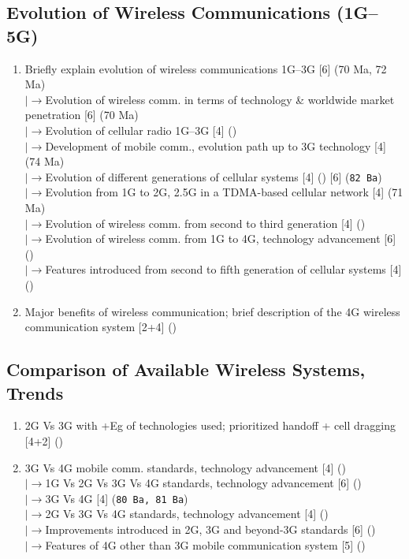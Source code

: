 \documentclass[12pt]{article}
\newcommand{\lb}{\\$\left|\rightarrow\right.$}
\begin{document}
  \subsection{Evolution of Wireless Communications (1G--5G)}
    \begin{enumerate}[topsep=0pt, noitemsep]
      \item Briefly explain evolution of wireless communications 1G--3G \hfill [6] (70 Ma, 72 Ma)
        \lb Evolution of wireless comm. in terms of technology \& worldwide market penetration \hfill [6] (70 Ma)
        \lb Evolution of cellular radio 1G--3G \hfill [4] ()
        \lb Development of mobile comm., evolution path up to 3G technology \hfill [4] (74 Ma)
        \lb Evolution of different generations of cellular systems \hfill [4] () [6] (\texttt{82 Ba})
        \lb Evolution from 1G to 2G, 2.5G in a TDMA-based cellular network \hfill [4] (71 Ma)
        \lb Evolution of wireless comm. from second to third generation \hfill [4] ()
        \lb Evolution of wireless comm. from 1G to 4G, technology advancement \hfill [6] ()
        \lb Features introduced from second to fifth generation of cellular systems \hfill [4] ()
      \item Major benefits of wireless communication; brief description of the 4G wireless communication system \hfill [2+4] ()
    \end{enumerate}

  \subsection{Comparison of Available Wireless Systems, Trends}
    \begin{enumerate}[topsep=0pt, noitemsep]
      \item 2G Vs 3G with +Eg of technologies used; prioritized handoff + cell dragging \hfill [4+2] ()
      \item 3G Vs 4G mobile comm. standards, technology advancement \hfill [4] ()
        \lb 1G Vs 2G Vs 3G Vs 4G standards, technology advancement \hfill [6] ()
        \lb 3G Vs 4G \hfill [4] (\texttt{80 Ba, 81 Ba})
        \lb 2G Vs 3G Vs 4G standards, technology advancement \hfill [4] ()
        \lb Improvements introduced in 2G, 3G and beyond-3G standards \hfill [6] ()
        \lb Features of 4G other than 3G mobile communication system \hfill [5] ()
    \end{enumerate}
\end{document}
